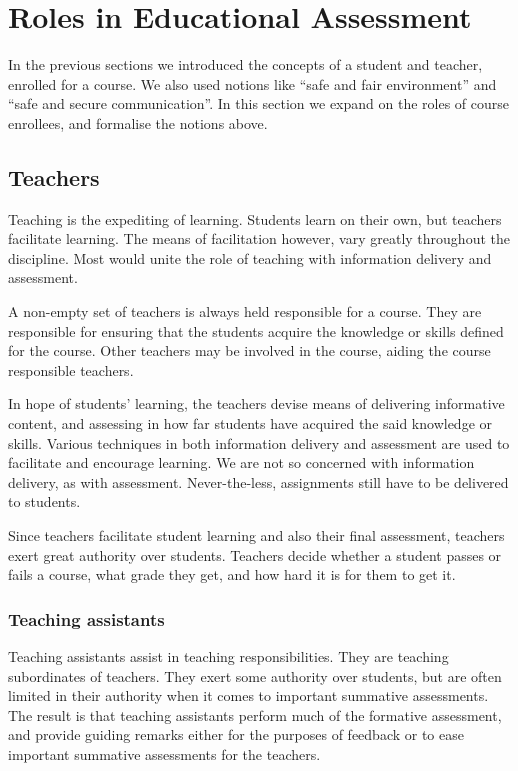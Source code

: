 
\section{Roles in Educational Assessment}

In the previous sections we introduced the concepts of a student and teacher,
enrolled for a course. We also used notions like ``safe and fair environment''
and ``safe and secure communication''. In this section we expand on the roles
of course enrollees, and formalise the notions above.

\subsection{Teachers}

Teaching is the expediting of learning. Students learn on their own, but
teachers facilitate learning\cite{skinner-1965}. The means of facilitation
however, vary greatly throughout the discipline\cite{ramsden-1992,kember-1997}.
Most would unite the role of teaching with information delivery and assessment.

A non-empty set of teachers is always held responsible for a course. They are
responsible for ensuring that the students acquire the knowledge or skills
defined for the course. Other teachers may be involved in the course, aiding
the course responsible teachers.

In hope of students' learning, the teachers devise means of delivering
informative content, and assessing in how far students have acquired the said
knowledge or skills. Various techniques in both information delivery and
assessment are used to facilitate and encourage learning. We are not so
concerned with information delivery, as with assessment. Never-the-less,
assignments still have to be delivered to students.

Since teachers facilitate student learning and also their final assessment,
teachers exert great authority over students. Teachers decide whether a student
passes or fails a course, what grade they get, and how hard it is for them to
get it.

\subsubsection{Teaching assistants}

Teaching assistants assist in teaching responsibilities. They are teaching
subordinates of teachers. They exert some authority over students, but are
often limited in their authority when it comes to important summative
assessments. The result is that teaching assistants perform much of the
formative assessment, and provide guiding remarks either for the purposes of
feedback or to ease important summative assessments for the teachers.

